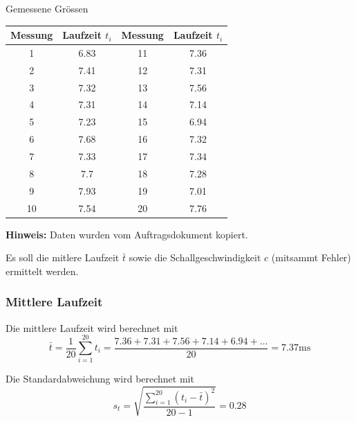 \begin{center}
    \begin{threeparttable}
        \caption{Gemessene Gr\"ossen}
        \begin{tabular}{cccc}
            \toprule
            Messung & Laufzeit $t_i$ & Messung & Laufzeit $t_i$ \\
            \midrule
            1  & 6.83 & 11 & 7.36 \\
            2  & 7.41 & 12 & 7.31 \\
            3  & 7.32 & 13 & 7.56 \\
            4  & 7.31 & 14 & 7.14 \\
            5  & 7.23 & 15 & 6.94 \\
            6  & 7.68 & 16 & 7.32 \\
            7  & 7.33 & 17 & 7.34 \\
            8  & 7.7  & 18 & 7.28 \\
            9  & 7.93 & 19 & 7.01 \\
            10 & 7.54 & 20 & 7.76 \\
           \bottomrule
        \end{tabular}
        \begin{tablenotes}
            \small
            \item \textbf{Hinweis:} Daten wurden vom Auftragsdokument kopiert.
        \end{tablenotes}
        \label{table:schallgeschwindigkeit}
    \end{threeparttable}
\end{center}

Es soll die mitlere Laufzeit $\bar{t}$ sowie die Schallgeschwindigkeit $c$ (mitsammt Fehler) ermittelt werden.


\subsubsection*{Mittlere Laufzeit}

Die mittlere Laufzeit wird berechnet mit
\begin{equation}
    \bar{t} = \frac{1}{20} \sum_{i=1}^{20} t_i = \frac{7.36+7.31+7.56+7.14+6.94+\ldots}{20} = 7.37 \textrm{ms}
\end{equation}

Die Standardabweichung wird berechnet mit
\begin{equation}
    s_t = \sqrt{ \frac{ \sum_{i=1}^{20} (t_i - \bar{t})^2 }{20-1} } = 0.28
\end{equation}

